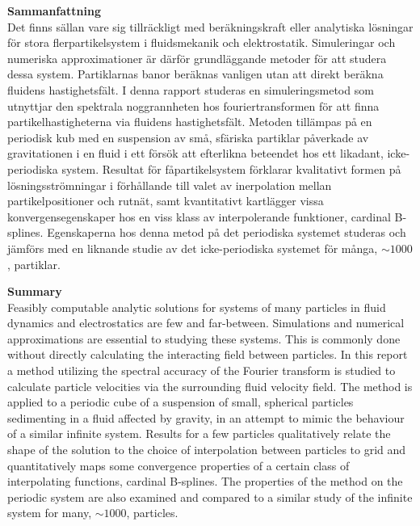\documentclass[a4paper,
twoside=false,abstract=false,numbers=noenddot,
titlepage=false,headings=small,parskip=half,version=last]{scrartcl}
\begin{document}
{\Large \bf Sammanfattning}\\
Det finns sällan vare sig tillräckligt med beräkningskraft eller analytiska lösningar för stora flerpartikelsystem i fluidsmekanik och elektrostatik.
Simuleringar och numeriska approximationer är därför grundläggande metoder för att studera dessa system.
Partiklarnas banor beräknas vanligen utan att direkt beräkna fluidens hastighetsfält.
I denna rapport studeras en simuleringsmetod som utnyttjar den spektrala noggrannheten hos fouriertransformen för att finna partikelhastigheterna via fluidens hastighetsfält.
Metoden tillämpas på en periodisk kub med en suspension av små, sfäriska partiklar påverkade av gravitationen i en fluid i ett försök att efterlikna beteendet hos ett likadant, icke-periodiska system.
Resultat för fåpartikelsystem förklarar kvalitativt formen på lösningsströmningar i förhållande till valet av inerpolation mellan partikelpositioner och rutnät, samt kvantitativt kartlägger vissa konvergensegenskaper hos en viss klass av interpolerande funktioner, cardinal B-splines.
Egenskaperna hos denna metod på det periodiska systemet studeras och jämförs med en liknande studie av det icke-periodiska systemet för många, $\sim 1000$, partiklar.

\vspace{20mm}
{\Large \bf Summary}\\
Feasibly computable analytic solutions for systems of many particles in fluid dynamics and electrostatics are few and far-between.
Simulations and numerical approximations are essential to studying these systems.
This is commonly done without directly calculating the interacting field between particles.
In this report a method utilizing the spectral accuracy of the Fourier transform is studied to calculate particle velocities via the surrounding fluid velocity field.
The method is applied to a periodic cube of a suspension of small, spherical particles sedimenting in a fluid affected by gravity, in an attempt to mimic the behaviour of a similar infinite system.
Results for a few particles qualitatively relate the shape of the solution to the choice of interpolation between particles to grid and quantitatively maps some convergence properties of a certain class of interpolating functions, cardinal B-splines.
The properties of the method on the periodic system are also examined and compared to a similar study of the infinite system for many, $\sim 1000$, particles.
\end{document}
